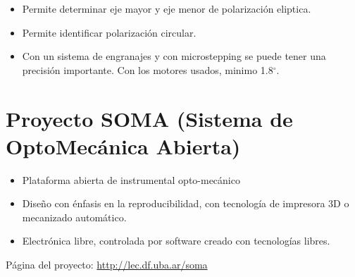 \documentclass{article}
\begin{document}
    \begin{itemize}
        \item Permite determinar eje mayor y eje menor de polarización eliptica. 
        \item Permite identificar polarización circular.
        \item Con un sistema de engranajes y con microstepping se puede tener una precisión importante. Con los motores usados, minimo 1.8$^\circ$.
    \end{itemize}



\section{Proyecto SOMA (Sistema de OptoMecánica Abierta)}

    \begin{itemize}
        \item Plataforma abierta de instrumental opto-mecánico
        \item Diseño con énfasis en la reproducibilidad, con tecnología de impresora 3D o mecanizado automático.
        \item Electrónica libre, controlada por software creado con tecnologías libres.
    \end{itemize}

    Página del proyecto: \url{http://lec.df.uba.ar/soma}
\end{document}
